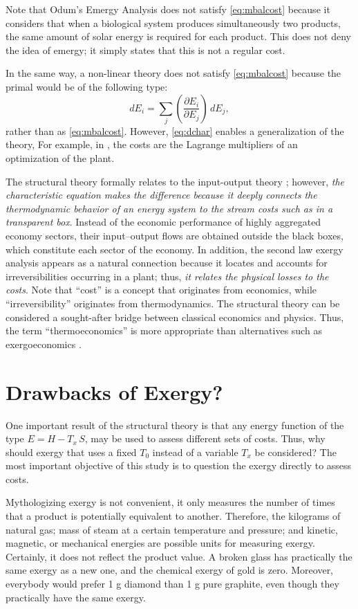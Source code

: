 \documentclass[energies,article,submit,moreauthors,pdftex]{Definitions/mdpi}
\newcommand{\dpartial}[2]{\left(\dfrac{\partial E_{#1}}{\partial E_{#2}}\right)}
\begin{document}
Note that Odum's Emergy Analysis \cite{Odum1988,Brown1996} does not satisfy \eqref{eq:mbalcost} because it considers that when a biological system produces simultaneously two products, the same amount of solar energy is required for each product. This does not deny the idea of emergy; it simply states that this is not a regular cost.

In the same way, a non-linear theory does not satisfy \cref{eq:mbalcost} because the primal would be of the following type:
\begin{equation}
dE_i=\sum_j \dpartial{i}{j}\, dE_j,
\label{eq:dchar}
\end{equation}
rather than as \cref{eq:mbalcost}. However, \cref{eq:dchar} enables a generalization of the theory, For example, in \cite{Brown1996}, the costs are the Lagrange multipliers of an optimization of the plant.

The structural theory formally relates to the input-output theory \cite{Leontief1970}; however, \emph{the characteristic equation makes the difference because it deeply connects the thermodynamic behavior of an energy system to the stream costs such as in a transparent box}. Instead of the economic performance of highly aggregated economy sectors, their input–output flows are obtained outside the black boxes, which constitute each sector of the economy. In addition, the second law exergy analysis appears as a natural connection because it locates and accounts for irreversibilities occurring in a plant; thus, \emph{it relates the physical losses to the costs}. Note that “cost” is a concept that originates from economics, while “irreversibility” originates from thermodynamics. The structural theory can be considered a sought-after bridge between classical economics and physics. Thus, the term “thermoeconomics” is more appropriate than alternatives such as exergoeconomics \cite{Tsatsaronis2007}. 


\section{Drawbacks of Exergy?}
One important result of the structural theory is that any energy function of the type ${E=H-T_x\,S}$, may be used to assess different sets of costs. Thus, why should exergy that uses a fixed $T_0$ instead of a variable $T_x$ be considered? The most important objective of this study is to question the exergy directly to assess costs. 

Mythologizing exergy is not convenient, it only measures the number of times that a product is potentially equivalent to another. Therefore, the kilograms of natural gas; mass of steam at a certain temperature and pressure; and kinetic, magnetic, or mechanical energies are possible units for measuring exergy. Certainly, it does not reflect the product value. A broken glass has practically the same exergy as a new one, and the chemical exergy of gold is zero. Moreover, everybody would prefer 1 g diamond than 1 g pure graphite, even though they practically have the same exergy.
\end{document}
